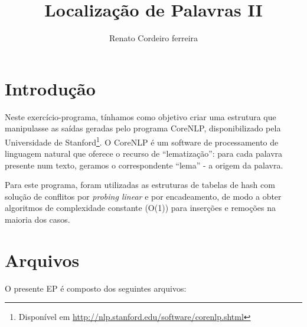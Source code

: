 \documentclass[a4paper,12pt]{article}
\title {Localização de Palavras II}
\author{Renato Cordeiro ferreira}
\begin{document}
\newpage %

\maketitle

\section{Introdução} 

    Neste exercício-programa, tínhamos como objetivo criar uma estrutura
    que manipulasse as saídas geradas pelo programa CoreNLP,     
    disponibilizado pela Universidade de Stanford\footnote{Disponível em
    \url{http://nlp.stanford.edu/software/corenlp.shtml}}. O CoreNLP é 
    um software de processamento de linguagem natural que oferece o 
    recurso de ``lematização'': para cada palavra presente num texto,
    geramos o correspondente ``lema'' - a origem da palavra.

    Para este programa, foram utilizadas as estruturas de tabelas de
    hash com solução de conflitos por \textit{probing linear} e por
    encadeamento, de modo a obter algoritmos de complexidade constante
    (O(1)) para inserções e remoções na maioria dos casos.
    
\section{Arquivos} 
    
    O presente EP é composto dos seguintes arquivos:    
    
\end{document}
